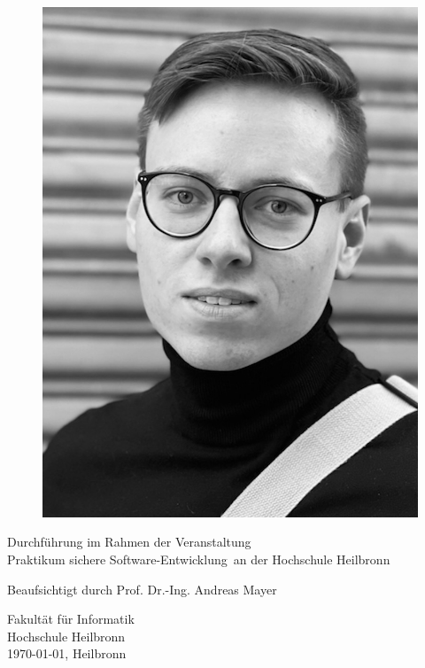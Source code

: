 \documentclass[10pt, a4paper,onecolumn ,titlepage]{article}
\begin{document}
\begin{titlepage}
\begin{center}
\begin{figure}[H]
\begin{minipage}[b]{.13\linewidth}
                    \includegraphics[width=\linewidth]{author_pictures/chris_2}
                \end{minipage}\label{fig:frederik}
            \end{figure}


            \vfill

            Durchführung im Rahmen der Veranstaltung \\ \glqq Praktikum sichere Software-Entwicklung\grqq\ an der Hochschule Heilbronn

            \vspace{0.2cm}

            Beaufsichtigt durch Prof. Dr.-Ing. Andreas Mayer

            \vspace{1.0cm}


            \vspace{0.8cm}

            Fakultät für Informatik\\
            Hochschule Heilbronn\\
            \today{}, Heilbronn

        \end{center}

    \end{titlepage}
\end{document}

